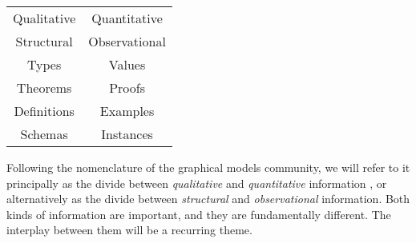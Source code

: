 \begin{center}
    \begin{tabular}{c|c}
        Qualitative & Quantitative \\ 
        Structural & Observational \\
            \hline
        Types & Values \\ 
        Theorems & Proofs \\
        Definitions & Examples \\
        Schemas & Instances 
    \end{tabular}
\end{center}

%    
Following the nomenclature of the graphical models community, we will refer to it principally as the divide between \emph{qualitative} and \emph{quantitative} information 
\unskip, or alternatively as the divide between \emph{structural} and \emph{observational} information.
%
Both kinds of information are important, and they are fundamentally different.
The interplay between them will be a recurring theme.


